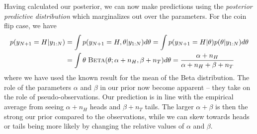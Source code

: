 Having calculated our posterior, we can now make
predictions using the \emph{posterior predictive distribution} which marginalizes out over
the parameters.  For the coin flip case, we have
\begin{align}
\label{eq:bayes:post-pred}
p( y_{N+1}=H | y_{1:N}) &= \int p(y_{N+1}=H, \theta | y_{1:N}) d\theta
= \int p(y_{N+1}=H | \theta) p(\theta | y_{1:N})  d\theta \nonumber \\
&= \int  \theta \; \textsc{Beta}(\theta ; \alpha+n_H, \beta+n_T) d\theta 
=\frac{\alpha+n_H}{\alpha+n_H+\beta+n_T}
\end{align}
where we have used the known result for the mean of the Beta distribution.
The role of the parameters $\alpha$ and $\beta$ in our prior now become apparent
-- they take on the role of pseudo-observations.  Our prediction is in line with the
empirical average from seeing $\alpha+n_H$ heads and $\beta+n_T$ tails.  The larger
$\alpha+\beta$ is then the strong our prior compared to the observations, while we
can skew towards heads or tails being more likely by changing the relative values of $\alpha$
and $\beta$.

